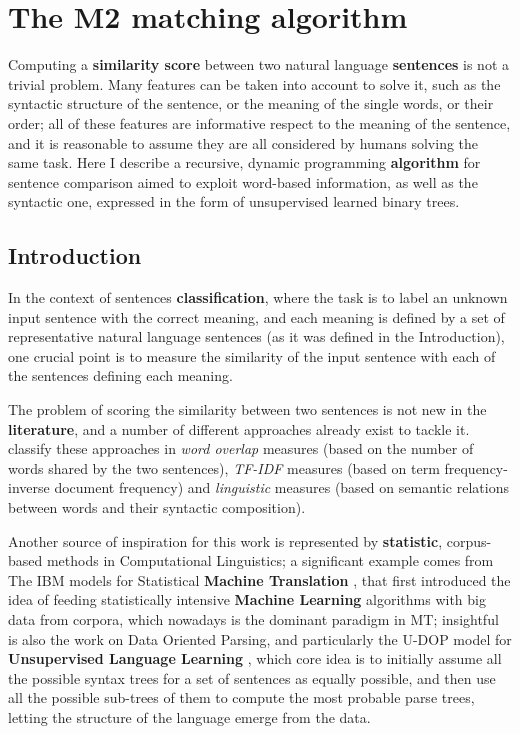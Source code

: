 
\chapter{The M2 matching algorithm} %

\label{ch:M2} %


Computing a \textbf{similarity score} between two natural language \textbf{sentences} is not a trivial problem. Many features can be taken into account to solve it, such as the syntactic structure of the sentence, or the meaning of the single words, or their order; all of these features are informative respect to the meaning of the sentence, and it is reasonable to assume they are all considered by humans solving the same task. Here I describe a recursive, dynamic programming \textbf{algorithm} for sentence comparison aimed to exploit word-based information, as well as the syntactic one, expressed in the form of unsupervised learned binary trees.

\section{Introduction}
In the context of sentences \textbf{classification}, where the task is to label an unknown input sentence with the correct meaning, and each meaning is defined by a set of representative natural language sentences (as it was defined in the Introduction), one crucial point is to measure the similarity of the input sentence with each of the sentences defining each meaning.

The problem of scoring the similarity between two sentences is not new in the \textbf{literature}, and a number of different approaches already exist to tackle it. \cite{Achananuparp:2008:ESS:1430555.1430594} classify these approaches in \emph{word overlap} measures (based on the number of words shared by the two sentences), \emph{TF-IDF} measures (based on term frequency-inverse document frequency) and \emph{linguistic} measures (based on semantic relations between words and their syntactic composition).

Another source of inspiration for this work is represented by \textbf{statistic}, corpus-based methods in Computational Linguistics; a significant example comes from The IBM models for Statistical \textbf{Machine Translation} \citep{Brown:1993:MSM:972470.972474}, that first introduced the idea of feeding statistically intensive \textbf{Machine Learning} algorithms with big data from corpora, which nowadays is the dominant paradigm in MT; insightful is also the work on Data Oriented Parsing, and particularly the U-DOP model for \textbf{Unsupervised Language Learning} \citep{Bod:2006:UPU:1596276.1596293}, which core idea is to initially assume all the possible syntax trees for a set of sentences as equally possible, and then use all the possible sub-trees of them to compute the most probable parse trees, letting the structure of the language emerge from the data.


